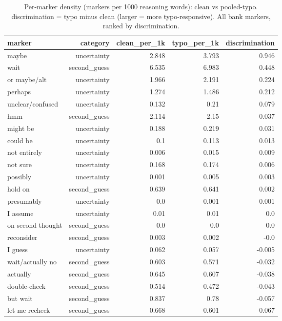 \documentclass[11pt]{article}
\begin{document}
\begin{table}[H]
\centering
\caption{Per-marker density (markers per 1000 reasoning words): clean vs pooled-typo. discrimination = typo minus clean (larger = more typo-responsive). All bank markers, ranked by discrimination.}
\small
\begin{adjustbox}{max width=\textwidth}
\begin{tabular}{lrrrr}
\toprule
\textbf{marker} & \textbf{category} & \textbf{clean\_per\_1k} & \textbf{typo\_per\_1k} & \textbf{discrimination} \\
\midrule
maybe & uncertainty & 2.848 & 3.793 & 0.946 \\
wait & second\_guess & 6.535 & 6.983 & 0.448 \\
or maybe/alt & uncertainty & 1.966 & 2.191 & 0.224 \\
perhaps & uncertainty & 1.274 & 1.486 & 0.212 \\
unclear/confused & uncertainty & 0.132 & 0.21 & 0.079 \\
hmm & second\_guess & 2.114 & 2.15 & 0.037 \\
might be & uncertainty & 0.188 & 0.219 & 0.031 \\
could be & uncertainty & 0.1 & 0.113 & 0.013 \\
not entirely & uncertainty & 0.006 & 0.015 & 0.009 \\
not sure & uncertainty & 0.168 & 0.174 & 0.006 \\
possibly & uncertainty & 0.001 & 0.005 & 0.003 \\
hold on & second\_guess & 0.639 & 0.641 & 0.002 \\
presumably & uncertainty & 0.0 & 0.001 & 0.001 \\
I assume & uncertainty & 0.01 & 0.01 & 0.0 \\
on second thought & second\_guess & 0.0 & 0.0 & 0.0 \\
reconsider & second\_guess & 0.003 & 0.002 & -0.0 \\
I guess & uncertainty & 0.062 & 0.057 & -0.005 \\
wait/actually no & second\_guess & 0.603 & 0.571 & -0.032 \\
actually & second\_guess & 0.645 & 0.607 & -0.038 \\
double-check & second\_guess & 0.514 & 0.472 & -0.043 \\
but wait & second\_guess & 0.837 & 0.78 & -0.057 \\
let me recheck & second\_guess & 0.668 & 0.601 & -0.067 \\
\bottomrule
\end{tabular}
\end{adjustbox}
\end{table}
\end{document}
